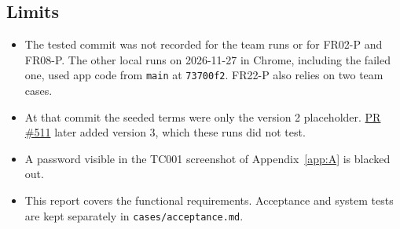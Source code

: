 \documentclass[11pt]{article}
\newcommand{\code}[1]{\texttt{#1}}
\begin{document}
\subsection*{Limits}
\begin{itemize}[itemsep=2pt]
  \item The tested commit was not recorded for the team runs or for FR02-P and FR08-P. The other local runs on 2026-11-27 in Chrome, including the failed one, used app code from \code{main} at \code{73700f2}. FR22-P also relies on two team cases.
  \item At that commit the seeded terms were only the version 2 placeholder. \href{https://github.com/dannydufau/ecocollect/pull/511}{PR \#511} later added version 3, which these runs did not test.
  \item A password visible in the TC001 screenshot of Appendix~\ref{app:A} is blacked out.
  \item This report covers the functional requirements. Acceptance and system tests are kept separately in \code{cases/acceptance.md}.
\end{itemize}
\end{document}
